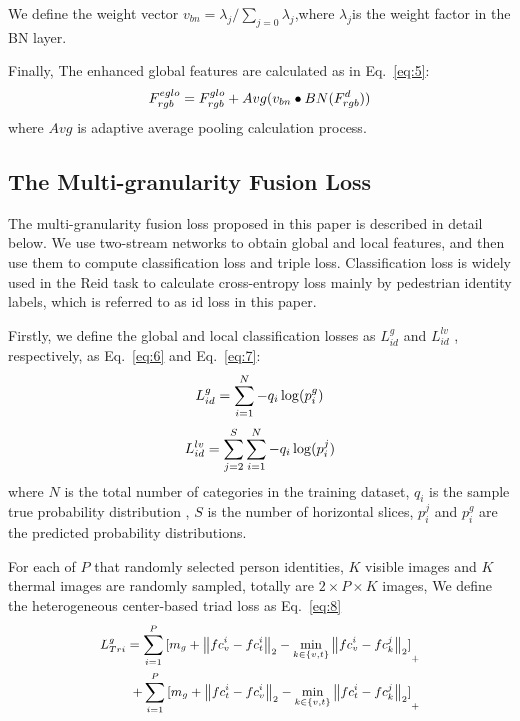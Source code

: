 \documentclass[journal]{IEEEtran}
\begin{document}
We define the weight vector ${v_{bn}} = {\lambda _j}/\sum\limits_{j = 0} {{\lambda _j}}$,where ${\lambda _j}$is the weight factor in the BN layer.

Finally, The enhanced global features are calculated as in Eq.~\ref{eq:5}:
\begin{equation}
	\small
	\label{eq:5}
	F_{rgb}^{eglo} = F_{rgb}^{glo} + Avg({v_{bn}} \bullet BN(F_{rgb}^d))
\end{equation}
where $Avg$ is adaptive average pooling calculation process. 
\subsection{The Multi-granularity Fusion Loss}
The multi-granularity fusion loss proposed in this paper is described in detail below. We use two-stream networks to obtain global and local features, and then use them to compute classification loss and triple loss. Classification loss is widely used in the Reid task to calculate cross-entropy loss mainly by pedestrian identity labels, which is referred to as id loss in this paper. 

Firstly, we define the global and local classification losses as $L_{id}^g$ and $L_{id}^{lv}$ , respectively, as Eq.~\ref{eq:6} and Eq.~\ref{eq:7}:
\begin{equation}
	\small
	\label{eq:6}
	L_{id}^g = \sum\limits_{i = 1}^N { - {q_i}} \log (p_i^g)
\end{equation}
\begin{equation}
	\small
	\label{eq:7}
L_{id}^{lv} = \sum\limits_{j = 2}^S {\sum\limits_{i = 1}^N { - {q_i}} \log (p_i^j)} {\rm{}}
\end{equation}
where $N$ is the total number of categories in the training dataset, ${q_i}$ is the sample true probability distribution , $S$ is the number of horizontal slices, $p_i^j$ and $p_i^g$ are the predicted probability distributions.

For each of $P$ that randomly selected person identities, $K$ visible images and $K$ thermal images are randomly sampled, totally are $2 \times P \times K$ images, We define the heterogeneous center-based triad loss as Eq.~\ref{eq:8}
\begin{equation}
	\small	
	\label{eq:8}
	\begin{aligned}	
	L_{Tri}^g = \sum\limits_{i = 1}^P {{{[{m_g} + {{\left\| {fc_v^i - fc_t^i} \right\|}_2} - \mathop {\min }\limits_{k \in \{ v,t\} } {{\left\| {fc_v^i - fc_k^j} \right\|}_2}]}_ + }}&\\
	 + \sum\limits_{i = 1}^P {{{[{m_g} + {{\left\| {fc_t^i - fc_v^i} \right\|}_2} - \mathop {\min }\limits_{k \in \{ v,t\} } {{\left\| {fc_t^i - fc_k^j} \right\|}_2}]}_ + }}& 
\end{aligned}
\end{equation}
\end{document}
